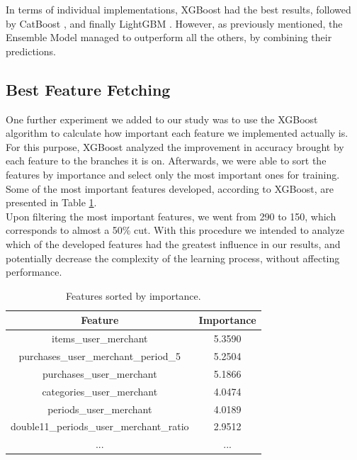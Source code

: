 \documentclass{article}
\begin{document}
In terms of individual implementations, XGBoost \cite{xgboost} had the best results, followed by CatBoost \cite{catboost}, and finally LightGBM \cite{lightgbm}. However, as previously mentioned, the Ensemble Model managed to outperform all the others, by combining their predictions.

\subsection{Best Feature Fetching}

One further experiment we added to our study was to use the XGBoost \cite{xgboost} algorithm to calculate how important each feature we implemented actually is. For this purpose, XGBoost analyzed the improvement in accuracy brought by each feature to the branches it is on. Afterwards, we were able to sort the features by importance and select only the most important ones for training. Some of the most important features developed, according to XGBoost, are presented in Table \ref{tab:fetimportance}.\\
Upon filtering the most important features, we went from 290 to 150, which corresponds to almost a 50\% cut. With this procedure we intended to analyze which of the developed features had the greatest influence in our results, and potentially decrease the complexity of the learning process, without affecting performance.

\vspace{2cm}

\begin{table}[h!]
\centering
\setlength{\extrarowheight}{3pt}
\begin{tabular}{|c|c|}
    \hline
    \textbf{Feature} & \textbf{Importance}\\
    \hline
    items\_user\_merchant & 5.3590\\
    \hline
    purchases\_user\_merchant\_period\_5 & 5.2504\\
    \hline
    purchases\_user\_merchant & 5.1866\\
    \hline
    categories\_user\_merchant & 4.0474\\
    \hline
    periods\_user\_merchant & 4.0189\\
    \hline
    double11\_periods\_user\_merchant\_ratio & 2.9512\\
    \hline
    ... & ...\\
    \hline
\end{tabular}
\vspace{0.3cm}
\caption{Features sorted by importance.}
\label{tab:fetimportance}
\end{table}
\vspace{-0.3cm}
\end{document}
